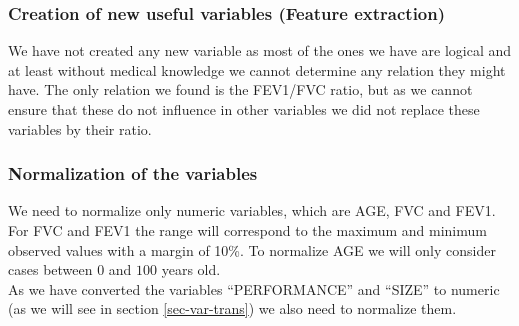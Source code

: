\subsubsection{Creation of new useful variables (Feature extraction)}

We have not created any new variable as most of the ones we have are logical and at least without medical knowledge we cannot determine any relation they might have. The only relation we found is the FEV1/FVC ratio, but as we cannot ensure that these do not influence in other variables we did not replace these variables by their ratio.


\subsubsection{Normalization of the variables}
We need to normalize only numeric variables, which are AGE, FVC and FEV1. For FVC and FEV1 the range will correspond to the maximum and minimum observed values with a margin of 10\%. To normalize AGE we will only consider cases between $0$ and $100$ years old. \\
As we have converted the variables ``PERFORMANCE'' and ``SIZE'' to numeric (as we will see in section \ref{sec-var-trans}) we also need to normalize them.









